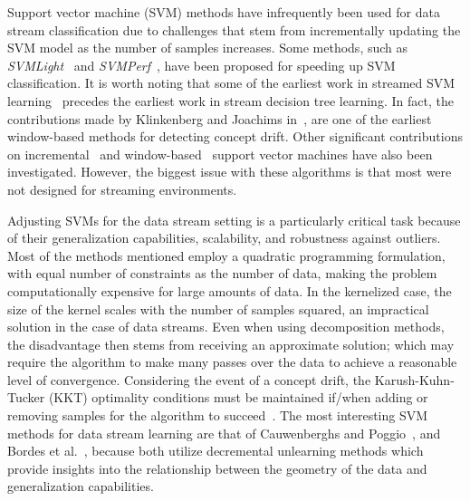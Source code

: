 \documentclass[reqno]{vcuthesis}
\numberwithin{equation}{chapter}
\begin{document}
Support vector machine (SVM) methods have infrequently been used for data stream classification due to challenges that stem from incrementally updating the SVM model as the number of samples increases. Some methods, such as \textit{SVMLight}~\cite{Joachims1999} and \textit{SVMPerf}~\cite{joachims2006training}, have been proposed for speeding up SVM classification. It is worth noting that some of the earliest work in streamed SVM learning~\cite{klinkenberg2000detecting,syed1999handling} precedes the earliest work in stream decision tree learning. In fact, the contributions made by Klinkenberg and Joachims in~\cite{klinkenberg2000detecting}, are one of the earliest window-based methods for detecting concept drift. Other significant contributions on incremental~\cite{bordes2005fast,cauwenberghs2001incremental,ralaivola2001incremental,ruping2001incremental,shilton2005incremental} and window-based~\cite{domeniconi2001incremental,fung2002incremental} support vector machines have also been investigated. However, the biggest issue with these algorithms is that most were not designed for streaming environments. 

Adjusting SVMs for the data stream setting is a particularly critical task because of their generalization capabilities, scalability, and robustness against outliers. Most of the methods mentioned employ a quadratic programming formulation, with equal number of constraints as the number of data, making the problem computationally expensive for large amounts of data. In the kernelized case, the size of the kernel scales with the number of samples squared, an impractical solution in the case of data streams. Even when using decomposition methods, the disadvantage then stems from receiving an approximate solution; which may require the algorithm to make many passes over the data to achieve a reasonable level of convergence. Considering the event of a concept drift, the Karush-Kuhn-Tucker (KKT) optimality conditions must be maintained if/when adding or removing samples for the algorithm to succeed~\cite{aggarwal,lawal2017adaptive}. The most interesting SVM methods for data stream learning are that of Cauwenberghs and Poggio~\cite{cauwenberghs2001incremental}, and Bordes et al.~\cite{bordes2005fast}, because both utilize decremental unlearning methods which provide insights into the relationship between the geometry of the data and generalization capabilities.
\end{document}
